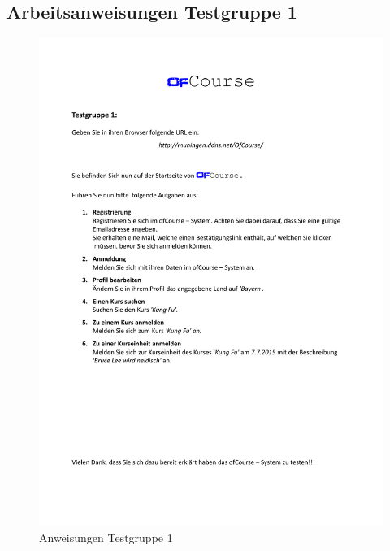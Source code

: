 \subsection*{Arbeitsanweisungen Testgruppe 1}
\begin{figure}[h]
	\centering
	\includegraphics[width=0.9\linewidth, page=1]{pdf/AnweisungenTestgruppe1}
	\caption{Anweisungen Testgruppe 1}
	\label{fig:Anweisungen1}
\end{figure}
